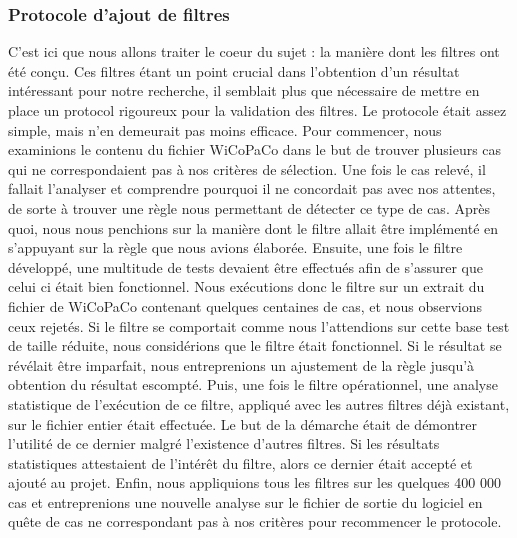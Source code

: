 \documentclass{article}
\begin{document}
\subsubsection{Protocole d'ajout de filtres}
C'est ici que nous allons traiter le coeur du sujet : la mani\`{e}re dont les filtres ont \'{e}t\'{e} con\c{c}u. Ces filtres \'{e}tant un point crucial dans l'obtention d'un r\'{e}sultat int\'{e}ressant pour notre recherche, il semblait plus que n\'{e}cessaire de mettre en place un protocol rigoureux pour la validation des filtres. Le protocole \'{e}tait assez simple, mais n'en demeurait pas moins efficace.
\newline
\newline
Pour commencer, nous examinions le contenu du fichier WiCoPaCo dans le but de trouver plusieurs cas qui ne correspondaient pas \`{a} nos crit\`{e}res de s\'{e}lection. Une fois le cas relev\'{e}, il fallait l'analyser et comprendre pourquoi il ne concordait pas avec nos attentes, de sorte \`{a} trouver une r\`{e}gle nous permettant de d\'{e}tecter ce type de cas. Apr\`{e}s quoi, nous nous penchions sur la mani\`{e}re dont le filtre allait \^{e}tre impl\'{e}ment\'{e} en s'appuyant sur la r\`{e}gle que nous avions \'{e}labor\'{e}e.
\newline
\newline
Ensuite, une fois le filtre d\'{e}velopp\'{e}, une multitude de tests devaient \^{e}tre effectu\'{e}s afin de s'assurer que celui ci \'{e}tait bien fonctionnel. Nous ex\'{e}cutions donc le filtre sur un extrait du fichier de WiCoPaCo contenant quelques centaines de cas, et nous observions ceux rejet\'{e}s. Si le filtre se comportait comme nous l'attendions sur cette base test de taille r\'{e}duite, nous consid\'{e}rions que le filtre \'{e}tait fonctionnel. Si le r\'{e}sultat se r\'{e}v\'{e}lait \^{e}tre imparfait, nous entreprenions un ajustement de la r\`{e}gle jusqu'\`{a} obtention du r\'{e}sultat escompt\'{e}. 
\newline
\newline
Puis, une fois le filtre op\'{e}rationnel, une analyse statistique de l'ex\'{e}cution de ce filtre, appliqu\'{e} avec les autres filtres d\'{e}j\`{a} existant, sur le fichier entier \'{e}tait effectu\'{e}e. Le but de la d\'{e}marche \'{e}tait de d\'{e}montrer l'utilit\'{e} de ce dernier malgr\'{e} l'existence d'autres filtres. Si les r\'{e}sultats statistiques attestaient de l'int\'{e}r\^{e}t du filtre, alors ce dernier \'{e}tait accept\'{e} et ajout\'{e} au projet.
\newline
\newline
Enfin, nous appliquions tous les filtres sur les quelques 400 000 cas et entreprenions une nouvelle analyse sur le fichier de sortie du logiciel en qu\^{e}te de cas ne correspondant pas \`{a} nos crit\`{e}res pour recommencer le protocole.
\end{document}
